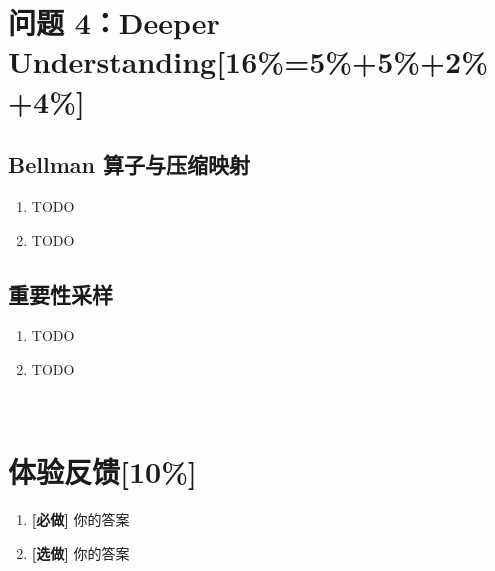 \documentclass{article}
\begin{document}
\section{问题 4：Deeper Understanding[16\%=5\%+5\%+2\%+4\%]}
\subsection{Bellman 算子与压缩映射}
\begin{enumerate}[label=(\alph*), start=1]
    
    \item TODO %
    
    \item TODO %
    
\end{enumerate}

\subsection{重要性采样}
\begin{enumerate}[label=(\alph*), start=1]
    
    \item TODO %
    
    \item TODO %
    
\end{enumerate}
\

\section*{体验反馈[10\%]}

\begin{enumerate}[label=(\alph*), start=1]
    \item \textbf{[必做]} %
    你的答案
    \item \textbf{[选做]} %
    你的答案
\end{enumerate}
\end{document}
